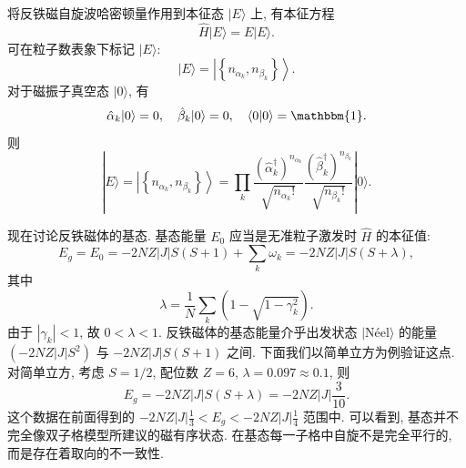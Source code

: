 将反铁磁自旋波哈密顿量作用到本征态 $|E\rangle$ 上, 有本征方程
\begin{equation}
\hat H |E\rangle=E |E\rangle.
\end{equation}
可在粒子数表象下标记 $|E\rangle$:
\begin{equation}
|E\rangle=\left|\left\{ n_{\alpha_{k}},n_{\beta_{k}}\right\}\right\rangle.
\end{equation}
对于磁振子真空态 $|0\rangle$, 有
\begin{equation}
\hat \alpha_{k}|0\rangle=0,\quad \hat \beta_{k}|0\rangle=0, \quad\langle 0| 0\rangle=\mathbbm{1}.
\end{equation}
则
\begin{equation}
|E\rangle=\left|\left\{ n_{\alpha_{k}},n_{\beta_{k}}\right\}\right\rangle=\prod_{k}\frac{\left(\hat\alpha_{k}^{\dagger}\right)^{n_{\alpha_{k}}}}{\sqrt{n_{\alpha_{k}}!}}\frac{\left(\hat\beta_{k}^{\dagger}\right)^{n_{\beta_{k}}}}{\sqrt{n_{\beta_{k}}!}}|0\rangle.
\end{equation}

现在讨论反铁磁体的基态. 基态能量 $E_{0}$ 应当是无准粒子激发时 $\hat H$ 的本征值:
\begin{equation}
E_{g}=E_{0} =-2 N Z|J| S(S+1)+ \sum_{k}\omega_{k}=-2 N Z|J| S(S+\lambda),
\end{equation}
其中
\begin{equation}
\lambda=\frac{1}{N} \sum_{k}\left(1-\sqrt{1-\gamma_{k}^{2}}\right).
\end{equation}
由于 $\left|\gamma_{k}\right|< 1$, 故 $0 < \lambda < 1$. 反铁磁体的基态能量介乎出发状态 $|\text{Néel}\rangle$ 的能量 $\left(-2 N Z|J| S^{2}\right)$ 与 $-2 N Z|J| S(S+1)$ 之间. 下面我们以简单立方为例验证这点.对简单立方, 考虑 $S=1/2$, 配位数 $Z=6$, $\lambda=0.097\approx 0.1$, 则
\begin{equation}
E_{g}=-2 N Z|J| S(S+\lambda)=-2 N Z|J|\frac{3}{10}.
\end{equation}
这个数据在前面得到的 $\displaystyle -2 N Z|J| \frac{1}{3}< E_{g}< -2 N Z|J| \frac{1}{4}$ 范围中. 可以看到, 基态并不完全像双子格模型所建议的磁有序状态. 在基态每一子格中自旋不是完全平行的, 而是存在着取向的不一致性.

